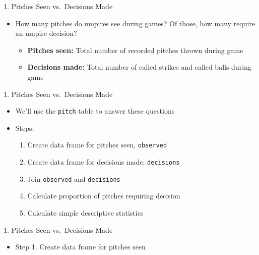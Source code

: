 \begin{frame}{1. Pitches Seen vs.~Decisions Made}

\begin{itemize}
\tightlist
\item
  How many pitches do umpires see during games? Of those, how many
  require an umpire decision?

  \begin{itemize}
  \tightlist
  \item
    \textbf{Pitches seen:} Total number of recorded pitches thrown
    during game
  \item
    \textbf{Decisions made:} Total number of called strikes and called
    balls during game
  \end{itemize}
\end{itemize}

\end{frame}

\begin{frame}[fragile]{1. Pitches Seen vs.~Decisions Made}

\begin{itemize}
\tightlist
\item
  We'll use the \texttt{pitch} table to answer these questions
\item
  Steps:

  \begin{enumerate}
  \def\labelenumi{\arabic{enumi}.}
  \tightlist
  \item
    Create data frame for pitches seen, \texttt{observed}
  \item
    Create data frame for decisions made, \texttt{decisions}
  \item
    Join \texttt{observed} and \texttt{decisions}
  \item
    Calculate proportion of pitches requiring decision
  \item
    Calculate simple descriptive statistics
  \end{enumerate}
\end{itemize}

\end{frame}

\begin{frame}[fragile]{1. Pitches Seen vs.~Decisions Made}

\begin{itemize}
\tightlist
\item
  Step 1. Create data frame for pitches seen
\end{itemize}

\footnotesize

\begin{Shaded}
\end{Shaded}

\end{frame}

